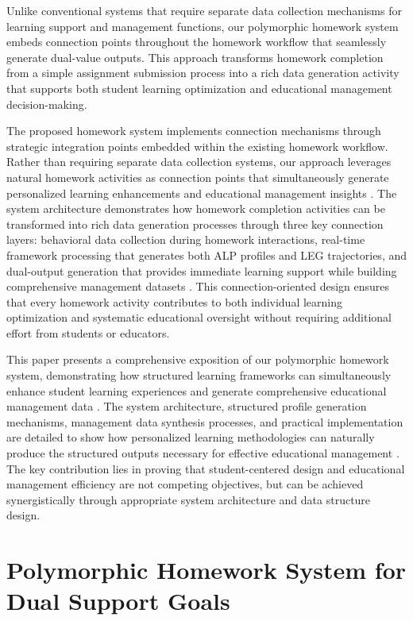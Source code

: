 \documentclass[conference]{IEEEtran}
\begin{document}
\begin{IEEEkeywords}
Unlike conventional systems that require separate data collection mechanisms for learning support and management functions, our polymorphic homework system embeds connection points throughout the homework workflow that seamlessly generate dual-value outputs. This approach transforms homework completion from a simple assignment submission process into a rich data generation activity that supports both student learning optimization and educational management decision-making.

The proposed homework system implements connection mechanisms through strategic integration points embedded within the existing homework workflow. Rather than requiring separate data collection systems, our approach leverages natural homework activities as connection points that simultaneously generate personalized learning enhancements and educational management insights \cite{zhang2025deep}. The system architecture demonstrates how homework completion activities can be transformed into rich data generation processes through three key connection layers: behavioral data collection during homework interactions, real-time framework processing that generates both ALP profiles and LEG trajectories, and dual-output generation that provides immediate learning support while building comprehensive management datasets \cite{sharples2024mobile}. This connection-oriented design ensures that every homework activity contributes to both individual learning optimization and systematic educational oversight without requiring additional effort from students or educators.

This paper presents a comprehensive exposition of our polymorphic homework system, demonstrating how structured learning frameworks can simultaneously enhance student learning experiences and generate comprehensive educational management data \cite{lu2025recommender}. The system architecture, structured profile generation mechanisms, management data synthesis processes, and practical implementation are detailed to show how personalized learning methodologies can naturally produce the structured outputs necessary for effective educational management \cite{koedinger2024learning}. The key contribution lies in proving that student-centered design and educational management efficiency are not competing objectives, but can be achieved synergistically through appropriate system architecture and data structure design.



\section{Polymorphic Homework System for Dual Support Goals}


\end{IEEEkeywords}
\end{document}
